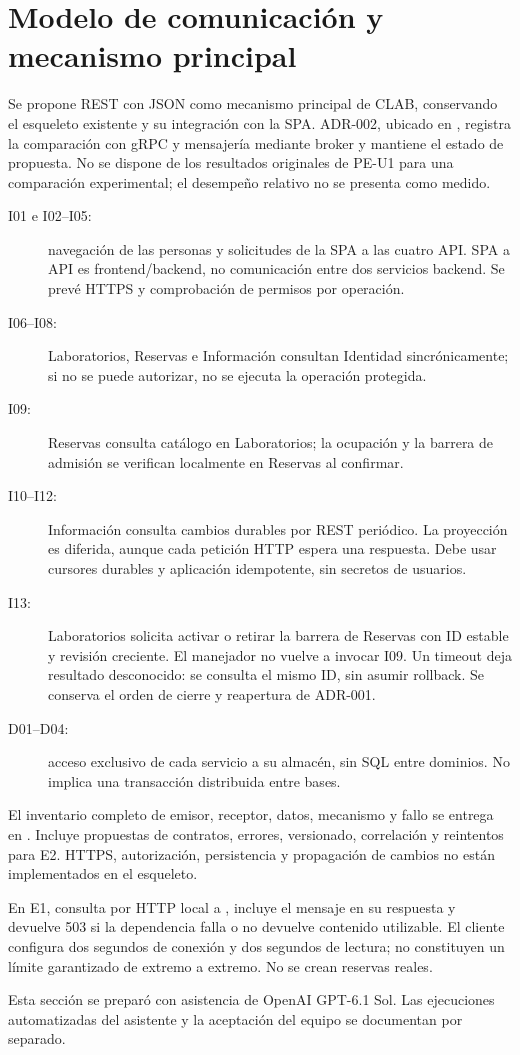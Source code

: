 \section{Modelo de comunicación y mecanismo principal}
\label{sec:clab-comunicacion}

Se propone REST con JSON como mecanismo principal de CLAB, conservando el
esqueleto existente y su integración con la SPA. ADR-002, ubicado en
, registra la comparación con
gRPC y mensajería mediante broker y mantiene el estado de propuesta. No se
dispone de los resultados originales de PE-U1 para una comparación experimental;
el desempeño relativo no se presenta como medido.

\begin{description}
  \item[I01 e I02--I05:] navegación de las personas y solicitudes de la SPA a
  las cuatro API. SPA a API es frontend/backend, no comunicación entre dos
  servicios backend. Se prevé HTTPS y comprobación de permisos por operación.
  \item[I06--I08:] Laboratorios, Reservas e Información consultan Identidad
  sincrónicamente; si no se puede autorizar, no se ejecuta la operación protegida.
  \item[I09:] Reservas consulta catálogo en Laboratorios; la ocupación y la
  barrera de admisión se verifican localmente en Reservas al confirmar.
  \item[I10--I12:] Información consulta cambios durables por REST periódico.
  La proyección es diferida, aunque cada petición HTTP espera una respuesta.
  Debe usar cursores durables y aplicación idempotente, sin secretos de usuarios.
  \item[I13:] Laboratorios solicita activar o retirar la barrera de Reservas
  con ID estable y revisión creciente. El manejador no vuelve a invocar I09.
  Un timeout deja resultado desconocido: se consulta el mismo ID, sin asumir
  rollback. Se conserva el orden de cierre y reapertura de ADR-001.
  \item[D01--D04:] acceso exclusivo de cada servicio a su almacén, sin SQL
  entre dominios. No implica una transacción distribuida entre bases.
\end{description}

El inventario completo de emisor, receptor, datos, mecanismo y fallo se entrega
en . Incluye propuestas de contratos,
errores, versionado, correlación y reintentos para E2. HTTPS, autorización,
persistencia y propagación de cambios no están implementados en el esqueleto.

En E1,  consulta por HTTP local a
, incluye el mensaje en su respuesta y devuelve
503 si la dependencia falla o no devuelve contenido utilizable. El cliente
configura dos segundos de conexión y dos segundos de lectura; no constituyen
un límite garantizado de extremo a extremo. No se crean reservas reales.

Esta sección se preparó con asistencia de OpenAI GPT-6.1 Sol. Las ejecuciones
automatizadas del asistente y la aceptación del equipo se documentan por separado.
